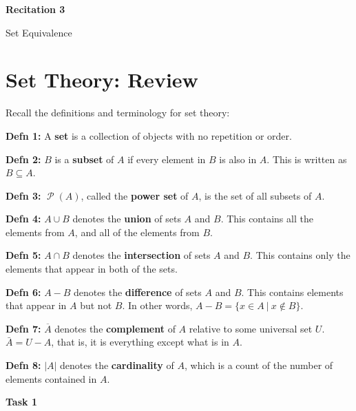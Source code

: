 \documentclass[12pt,letterpaper]{article}
\newcommand\Pow{\ensuremath{\operatorname{\mathcal{P}}}}
\begin{document}
  \thispagestyle{firstpagestyle}
  \begin{center}
    {\large \textbf{Recitation 3}}
    
    {\large Set Equivalence}

  \end{center}

\section*{Set Theory: Review}

Recall the definitions and terminology for set theory:

\textbf{Defn 1:} A \textbf{set} is a collection of objects with no repetition or order.

\textbf{Defn 2:} $B$ is a \textbf{subset} of $A$ if every element in $B$ is also in $A$. This is written as $B \subseteq A$.

\textbf{Defn 3:} $\Pow{(A)}$, called the \textbf{power set} of $A$, is the set of all subsets of $A$.

\textbf{Defn 4:} $A \cup B$ denotes the \textbf{union} of sets $A$ and $B$. This contains all the elements from $A$, and all of the elements from $B$. 
	
\textbf{Defn 5:} $A \cap B$ denotes the \textbf{intersection} of sets $A$ and $B$. This contains only the elements that appear in both of the sets.
	
\textbf{Defn 6:} $A - B$ denotes the \textbf{difference} of sets $A$ and $B$. This contains elements that appear in $A$ but not $B$. In other words, $A - B = \{x \in A \ | \ x \notin B\}$.
	
\textbf{Defn 7:} $\overline{A}$ denotes the \textbf{complement} of $A$ relative to some universal set $U$. $\bar{A} = U - A$, that is, it is everything except what is in $A$.
	
\textbf{Defn 8:} $|A|$ denotes the \textbf{cardinality} of $A$, which is a count of the number of elements contained in $A$.

\textbf{Task 1}
\end{document}
